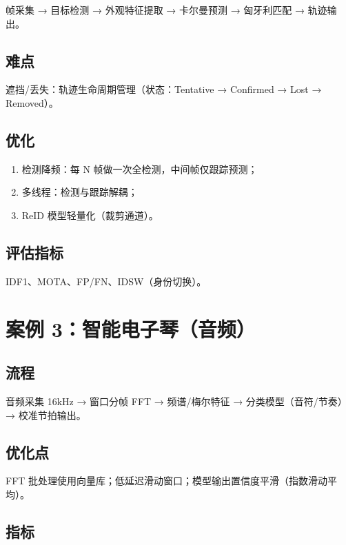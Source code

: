 帧采集 → 目标检测 → 外观特征提取 → 卡尔曼预测 → 匈牙利匹配 → 轨迹输出。

\subsection{难点}\label{ux96beux70b9}

遮挡/丢失：轨迹生命周期管理（状态：Tentative → Confirmed → Lost →
Removed）。

\subsection{优化}\label{ux4f18ux5316}

\begin{enumerate}
\def\labelenumi{\arabic{enumi}.}
\tightlist
\item
  检测降频：每 N 帧做一次全检测，中间帧仅跟踪预测；
\item
  多线程：检测与跟踪解耦；
\item
  ReID 模型轻量化（裁剪通道）。
\end{enumerate}

\subsection{评估指标}\label{ux8bc4ux4f30ux6307ux6807}

IDF1、MOTA、FP/FN、IDSW（身份切换）。

\section{案例
3：智能电子琴（音频）}\label{ux6848ux4f8b-3ux667aux80fdux7535ux5b50ux7434ux97f3ux9891}

\subsection{流程}\label{ux6d41ux7a0b-1}

音频采集 16kHz → 窗口分帧 FFT → 频谱/梅尔特征 → 分类模型（音符/节奏）→
校准节拍输出。

\subsection{优化点}\label{ux4f18ux5316ux70b9}

FFT
批处理使用向量库；低延迟滑动窗口；模型输出置信度平滑（指数滑动平均）。

\subsection{指标}\label{ux6307ux6807-1}

